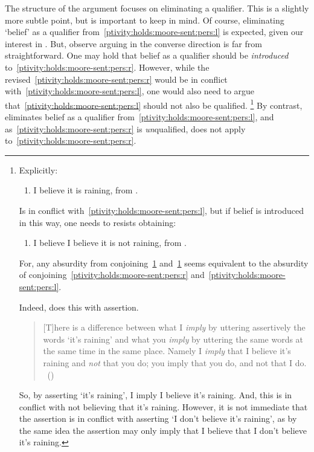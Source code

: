 \begin{note}
  The structure of the argument focuses on eliminating a qualifier.
  This is a slightly more subtle point, but is important to keep in mind.
  Of course, eliminating `belief' as a qualifier from~\ref{ptivity:holds:moore-sent:pers:l} is expected, given our interest in \ptivity{}.
  But, observe arguing in the converse direction is far from straightforward.
  One may hold that belief as a qualifier should be \emph{introduced} to~\ref{ptivity:holds:moore-sent:pers:r}.
  However, while the revised~\ref{ptivity:holds:moore-sent:pers:r} would be in conflict with~\ref{ptivity:holds:moore-sent:pers:l}, one would also need to argue that~\ref{ptivity:holds:moore-sent:pers:l} should not also be qualified.%
  \footnote{
    Explicitly:
    \begin{enumerate}[label=\emph{M\('\)\textsubscript{r+}}., ref=(\emph{M\('\)\textsubscript{r+}})]
    \item
      \label{ptivity:holds:moore-sent:pers:rq}
      I believe it is raining, from .
    \end{enumerate}
    Is in conflict with~\ref{ptivity:holds:moore-sent:pers:l}, but if belief is introduced in this way, one needs to resists obtaining:
    \begin{enumerate}[label=\emph{M\('\)\textsubscript{l+}}., ref=(\emph{M\('\)\textsubscript{l+}})]
    \item
      \label{ptivity:holds:moore-sent:pers:lq}
      I believe I believe it is not raining, from .
    \end{enumerate}
    For, any absurdity from conjoining~\ref{ptivity:holds:moore-sent:pers:rq} and~\ref{ptivity:holds:moore-sent:pers:lq} seems equivalent to the absurdity of conjoining~\ref{ptivity:holds:moore-sent:pers:r} and~\ref{ptivity:holds:moore-sent:pers:l}.

    Indeed, \citeauthor{Moore:1993wk} does this with assertion.
    \begin{quote}
      [T]here is a difference between what I \emph{imply} by uttering assertively the words `it's raining' and what you \emph{imply} by uttering the same words at the same time in the same place.
      Namely I \emph{imply} that I believe it's raining and \emph{not} that you do; you imply that you do, and not that I do.%
      \mbox{ }\hfill\mbox{(\citeyear[209--210]{Moore:1993wk})}
    \end{quote}
    So, by asserting `it's raining', I imply I believe it's raining.
    And, this is in conflict with not believing that it's raining.
    However, it is not immediate that the assertion is in conflict with asserting `I don't believe it's raining', as by the same idea the assertion may only imply that I believe that I don't believe it's raining.
  }
  By contrast, \ptivity{} eliminates belief as a qualifier from~\ref{ptivity:holds:moore-sent:pers:l}, and as~\ref{ptivity:holds:moore-sent:pers:r} is \emph{un}qualified, \ptivity{} does not apply to~\ref{ptivity:holds:moore-sent:pers:r}.
\end{note}

